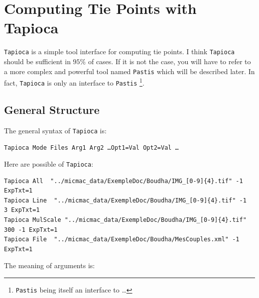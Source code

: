 



\section{Computing Tie Points with Tapioca}

{\tt Tapioca} is a simple tool interface for computing tie points.
I think {\tt Tapioca}  should be sufficient in $95\%$ of cases.
If it is not the case, you will have to refer to a more complex and powerful
tool named {\tt Pastis} which will be described later.
In fact, {\tt Tapioca} is only an interface to {\tt Pastis}
\footnote{{\tt Pastis}  being itself an interface to \SiftPP \dots}.

\label{Tapioca}


\subsection{General Structure}

The general syntax of {\tt Tapioca} is:

\begin{center}
   {\tt Tapioca   Mode  Files  Arg1 Arg2  \dots Opt1=Val Opt2=Val \dots}
\end{center}

Here are possible  of {\tt Tapioca}:

{\scriptsize
\begin{verbatim}
Tapioca All  "../micmac_data/ExempleDoc/Boudha/IMG_[0-9]{4}.tif" -1  ExpTxt=1
Tapioca Line  "../micmac_data/ExempleDoc/Boudha/IMG_[0-9]{4}.tif" -1   3 ExpTxt=1
Tapioca MulScale "../micmac_data/ExempleDoc/Boudha/IMG_[0-9]{4}.tif" 300 -1 ExpTxt=1
Tapioca File  "../micmac_data/ExempleDoc/Boudha/MesCouples.xml" -1  ExpTxt=1
\end{verbatim}
}


The meaning of arguments is:

